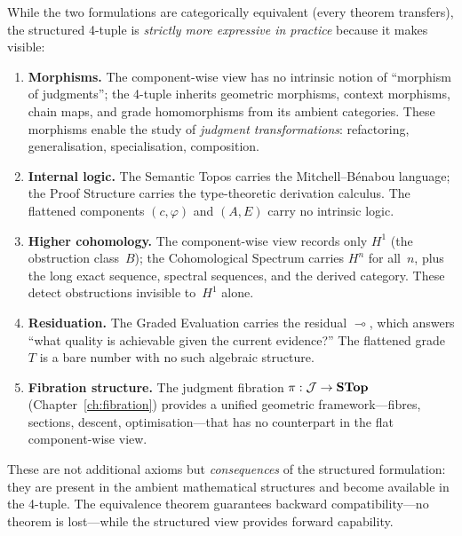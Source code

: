 \begin{remark}
\label{rem:strict-gain}
While the two formulations are categorically equivalent (every theorem
transfers), the structured 4-tuple is \emph{strictly more expressive in
practice} because it makes visible:

\begin{enumerate}[label=(\roman*),nosep]
\item \textbf{Morphisms.}  The component-wise view has no intrinsic
  notion of ``morphism of judgments''; the 4-tuple inherits geometric
  morphisms, context morphisms, chain maps, and grade homomorphisms
  from its ambient categories.  These morphisms enable the study of
  \emph{judgment transformations}: refactoring, generalisation,
  specialisation, composition.

\item \textbf{Internal logic.}  The Semantic Topos carries the
  Mitchell--B\'enabou language; the Proof Structure carries the
  type-theoretic derivation calculus.  The flattened components
  $(c, \varphi)$ and $(A, E)$ carry no intrinsic logic.

\item \textbf{Higher cohomology.}  The component-wise view records only
  $H^1$ (the obstruction class~$B$); the Cohomological Spectrum
  carries $H^n$ for all~$n$, plus the long exact sequence, spectral
  sequences, and the derived category.  These detect obstructions
  invisible to~$H^1$ alone.

\item \textbf{Residuation.}  The Graded Evaluation carries the
  residual $\multimap$, which answers ``what quality is achievable
  given the current evidence?''  The flattened grade~$T$ is a bare
  number with no such algebraic structure.

\item \textbf{Fibration structure.}  The judgment fibration
  $\pi : \mathcal{J} \to \mathbf{STop}$ (Chapter~\ref{ch:fibration}) provides
  a unified geometric framework---fibres, sections, descent,
  optimisation---that has no counterpart in the flat component-wise
  view.
\end{enumerate}

These are not additional axioms but \emph{consequences} of the
structured formulation: they are present in the ambient mathematical
structures and become available in the 4-tuple.  The equivalence
theorem guarantees backward compatibility---no theorem is lost---while
the structured view provides forward capability.
\end{remark}
